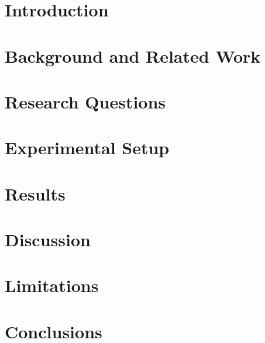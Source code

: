 \documentclass[conference]{IEEEtran}
\begin{document}
\maketitle

\begin{abstract}

\end{abstract}




\section{Introduction}

\section{Background and Related Work}

\section{Research Questions}





\section{Experimental Setup}

\section{Results}

\section{Discussion}

\section{Limitations}

\section{Conclusions}



\end{document}
